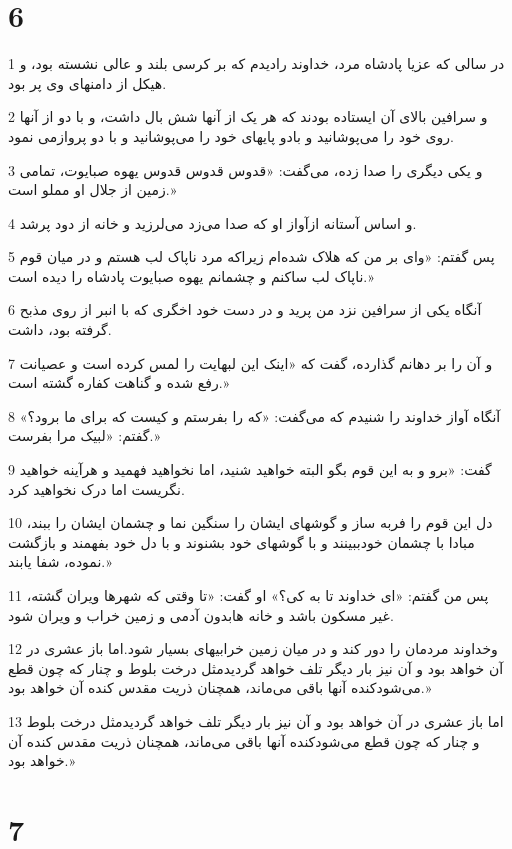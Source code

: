 \chapter{6}

\par 1 در سالی که عزیا پادشاه مرد، خداوند رادیدم که بر کرسی بلند و عالی نشسته بود، و هیکل از دامنهای وی پر بود.
\par 2 و سرافین بالای آن ایستاده بودند که هر یک از آنها شش بال داشت، و با دو از آنها روی خود را می‌پوشانید و بادو پایهای خود را می‌پوشانید و با دو پروازمی نمود.
\par 3 و یکی دیگری را صدا زده، می‌گفت: «قدوس قدوس قدوس یهوه صبایوت، تمامی زمین از جلال او مملو است.»
\par 4 و اساس آستانه ازآواز او که صدا می‌زد می‌لرزید و خانه از دود پرشد.
\par 5 پس گفتم: «وای بر من که هلاک شده‌ام زیراکه مرد ناپاک لب هستم و در میان قوم ناپاک لب ساکنم و چشمانم یهوه صبایوت پادشاه را دیده است.»
\par 6 آنگاه یکی از سرافین نزد من پرید و در دست خود اخگری که با انبر از روی مذبح گرفته بود، داشت.
\par 7 و آن را بر دهانم گذارده، گفت که «اینک این لبهایت را لمس کرده است و عصیانت رفع شده و گناهت کفاره گشته است.»
\par 8 آنگاه آواز خداوند را شنیدم که می‌گفت: «که را بفرستم و کیست که برای ما برود؟» گفتم: «لبیک مرا بفرست.»
\par 9 گفت: «برو و به این قوم بگو البته خواهید شنید، اما نخواهید فهمید و هرآینه خواهید نگریست اما درک نخواهید کرد.
\par 10 دل این قوم را فربه ساز و گوشهای ایشان را سنگین نما و چشمان ایشان را ببند، مبادا با چشمان خودببینند و با گوشهای خود بشنوند و با دل خود بفهمند و بازگشت نموده، شفا یابند.»
\par 11 پس من گفتم: «ای خداوند تا به کی؟» او گفت: «تا وقتی که شهرها ویران گشته، غیر مسکون باشد و خانه هابدون آدمی و زمین خراب و ویران شود.
\par 12 وخداوند مردمان را دور کند و در میان زمین خرابیهای بسیار شود.اما باز عشری در آن خواهد بود و آن نیز بار دیگر تلف خواهد گردیدمثل درخت بلوط و چنار که چون قطع می‌شودکنده آنها باقی می‌ماند، همچنان ذریت مقدس کنده آن خواهد بود.»
\par 13 اما باز عشری در آن خواهد بود و آن نیز بار دیگر تلف خواهد گردیدمثل درخت بلوط و چنار که چون قطع می‌شودکنده آنها باقی می‌ماند، همچنان ذریت مقدس کنده آن خواهد بود.»
 
\chapter{7}

